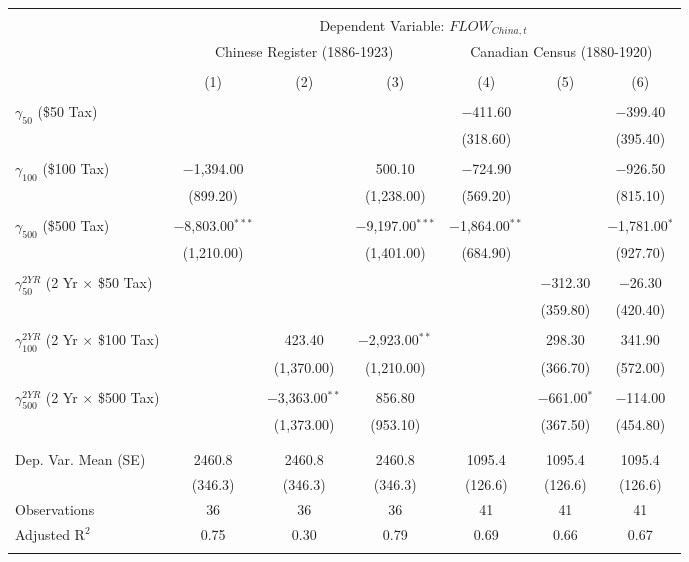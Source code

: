 
\begin{tabular}{@{\extracolsep{5pt}}lcccccc} 
\\[-1.8ex]\hline 
\hline \\[-1.8ex] 
 & \multicolumn{6}{c}{Dependent Variable: $FLOW_{China, t}$} \\ 
\cline{2-7} 
 & \multicolumn{3}{c}{Chinese Register (1886-1923)} & \multicolumn{3}{c}{Canadian Census (1880-1920)} \\ 
\\[-1.8ex] & (1) & (2) & (3) & (4) & (5) & (6)\\ 
\hline \\[-1.8ex] 
 $\gamma_{50}$ (\$50 Tax) &  &  &  & $-$411.60 &  & $-$399.40 \\ 
  &  &  &  & (318.60) &  & (395.40) \\ 
  & & & & & & \\ 
 $\gamma_{100}$ (\$100 Tax) & $-$1,394.00 &  & 500.10 & $-$724.90 &  & $-$926.50 \\ 
  & (899.20) &  & (1,238.00) & (569.20) &  & (815.10) \\ 
  & & & & & & \\ 
 $\gamma_{500}$ (\$500 Tax) & $-$8,803.00$^{***}$ &  & $-$9,197.00$^{***}$ & $-$1,864.00$^{**}$ &  & $-$1,781.00$^{*}$ \\ 
  & (1,210.00) &  & (1,401.00) & (684.90) &  & (927.70) \\ 
  & & & & & & \\ 
 $\gamma_{50}^{2YR}$ (2 Yr $\times$ \$50 Tax) &  &  &  &  & $-$312.30 & $-$26.30 \\ 
  &  &  &  &  & (359.80) & (420.40) \\ 
  & & & & & & \\ 
 $\gamma_{100}^{2YR}$ (2 Yr $\times$ \$100 Tax) &  & 423.40 & $-$2,923.00$^{**}$ &  & 298.30 & 341.90 \\ 
  &  & (1,370.00) & (1,210.00) &  & (366.70) & (572.00) \\ 
  & & & & & & \\ 
 $\gamma_{500}^{2YR}$ (2 Yr $\times$ \$500 Tax) &  & $-$3,363.00$^{**}$ & 856.80 &  & $-$661.00$^{*}$ & $-$114.00 \\ 
  &  & (1,373.00) & (953.10) &  & (367.50) & (454.80) \\ 
  & & & & & & \\ 
\hline \\[-1.8ex] 
Dep. Var. Mean (SE) & 2460.8 & 2460.8 & 2460.8 & 1095.4 & 1095.4 & 1095.4 \\ 
 & (346.3) & (346.3) & (346.3) & (126.6) & (126.6) & (126.6) \\ 
Observations & 36 & 36 & 36 & 41 & 41 & 41 \\ 
Adjusted R$^{2}$ & 0.75 & 0.30 & 0.79 & 0.69 & 0.66 & 0.67 \\ 
\hline 
\hline \\[-1.8ex] 
\end{tabular} 
